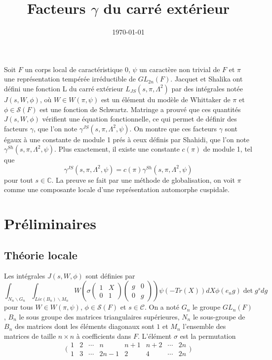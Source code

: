 \documentclass{amsart}
\begin{document}
\title{Facteurs $\gamma$ du carré extérieur}
\date{\today}
\maketitle

Soit $F$ un corps local de caractéristique $0$, $\psi$ un caractère non trivial de $F$ et $\pi$ une représentation tempérée irréductible de $GL_{2n}(F)$. Jacquet et Shalika ont défini une fonction L du carré extérieur $L_{JS}(s, \pi, \Lambda^2)$ par des intégrales notée $J(s, W, \phi)$, où $W \in W(\pi, \psi)$ est un élément du modèle de Whittaker de $\pi$ et $\phi \in \mathcal{S}(F)$ est une fonction de Schwartz. Matringe a prouvé que ces quantités $J(s,W,\phi)$ vérifient une équation fonctionnelle, ce qui permet de définir des facteurs $\gamma$, que l'on note $\gamma^{JS}(s,\pi,\Lambda^2,\psi)$. On montre que ces facteurs $\gamma$ sont égaux à une constante de module 1 prés à ceux définis par Shahidi, que l'on note $\gamma^{Sh}(s,\pi,\Lambda^2,\psi)$. Plus exactement, il existe une constante $c(\pi)$ de module 1, tel que
$$\gamma^{JS}(s,\pi,\Lambda^2,\psi)=c(\pi)\gamma^{Sh}(s,\pi,\Lambda^2,\psi)$$
pour tout $s \in \mathbb{C}$. La preuve se fait par une méthode de globalisation, on voit $\pi$ comme une composante locale d'une représentation automorphe cuspidale.

\section{Préliminaires}

\subsection{Théorie locale}
Les intégrales $J(s, W, \phi)$ sont définies par
 \begin{equation}
\int_{N_n\backslash{G_n}} \int_{Lie(B_n)\backslash{M_n}} W\left(\sigma \begin{pmatrix}
1 & X \\
0 & 1
\end{pmatrix}\begin{pmatrix}
g & 0 \\
0 & g
\end{pmatrix}\right)\psi(-Tr(X))dX\phi(e_ng)\det g^s dg
 \end{equation}
pour tous $W \in W(\pi, \psi)$, $\phi \in \mathcal{S}(F)$ et $s \in \mathcal{C}$. On a noté $G_n$ le groupe $GL_n(F)$, $B_n$ le sous groupe des matrices triangulaires supérieures, $N_n$ le sous-groupe de $B_n$ des matrices dont les éléments diagonaux sont $1$ et $M_n$ l'ensemble des matrices de taille $n \times n$ à coefficients dans $F$. L'élément $\sigma$ est la permutation
$$\bigl(\begin{smallmatrix}
    1 & 2 & \cdots & n & n+1 & n+2 & \cdots & 2n \\
    1 & 3 & \cdots &  2n-1  & 2 & 4 & \cdots & 2n
  \end{smallmatrix}\bigr)$$
  
\end{document}
